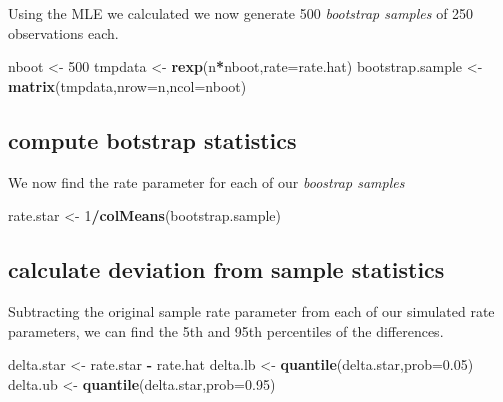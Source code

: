 \documentclass[]{book}
\newenvironment{Shaded}{\begin{snugshade}}{\end{snugshade}}
\newcommand{\KeywordTok}[1]{\textcolor[rgb]{0.13,0.29,0.53}{\textbf{#1}}}
\newcommand{\DataTypeTok}[1]{\textcolor[rgb]{0.13,0.29,0.53}{#1}}
\newcommand{\DecValTok}[1]{\textcolor[rgb]{0.00,0.00,0.81}{#1}}
\newcommand{\FloatTok}[1]{\textcolor[rgb]{0.00,0.00,0.81}{#1}}
\newcommand{\StringTok}[1]{\textcolor[rgb]{0.31,0.60,0.02}{#1}}
\newcommand{\OperatorTok}[1]{\textcolor[rgb]{0.81,0.36,0.00}{\textbf{#1}}}
\newcommand{\NormalTok}[1]{#1}
\theoremstyle{definition}
\theoremstyle{definition}
\theoremstyle{definition}
\theoremstyle{remark}
\begin{document}
Using the MLE we calculated we now generate 500 \emph{bootstrap samples}
of 250 observations each.

\begin{Shaded}
\begin{Highlighting}[]
\NormalTok{nboot <-}\StringTok{ }\DecValTok{500}
\NormalTok{tmpdata <-}\StringTok{ }\KeywordTok{rexp}\NormalTok{(n}\OperatorTok{*}\NormalTok{nboot,}\DataTypeTok{rate=}\NormalTok{rate.hat)}
\NormalTok{bootstrap.sample <-}\StringTok{ }\KeywordTok{matrix}\NormalTok{(tmpdata,}\DataTypeTok{nrow=}\NormalTok{n,}\DataTypeTok{ncol=}\NormalTok{nboot)}
\end{Highlighting}
\end{Shaded}

\subsection{compute botstrap
statistics}\label{compute-botstrap-statistics}

We now find the rate parameter for each of our \emph{boostrap samples}

\begin{Shaded}
\begin{Highlighting}[]
\NormalTok{rate.star <-}\StringTok{ }\DecValTok{1}\OperatorTok{/}\KeywordTok{colMeans}\NormalTok{(bootstrap.sample)}
\end{Highlighting}
\end{Shaded}

\subsection{calculate deviation from sample
statistics}\label{calculate-deviation-from-sample-statistics}

Subtracting the original sample rate parameter from each of our
simulated rate parameters, we can find the 5th and 95th percentiles of
the differences.

\begin{Shaded}
\begin{Highlighting}[]
\NormalTok{delta.star <-}\StringTok{ }\NormalTok{rate.star }\OperatorTok{-}\StringTok{ }\NormalTok{rate.hat}
\NormalTok{delta.lb <-}\StringTok{ }\KeywordTok{quantile}\NormalTok{(delta.star,}\DataTypeTok{prob=}\FloatTok{0.05}\NormalTok{)}
\NormalTok{delta.ub <-}\StringTok{ }\KeywordTok{quantile}\NormalTok{(delta.star,}\DataTypeTok{prob=}\FloatTok{0.95}\NormalTok{)}
\end{Highlighting}
\end{Shaded}
\end{document}
